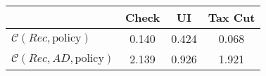 \begin{tabular}{@{}lccc@{}} 
\toprule 
                          & Check      & UI    & Tax Cut    \\  \midrule 
$\mathcal{C}(Rec,\text{policy})$ & 0.140  & 0.424  & 0.068     \\ 
$\mathcal{C}(Rec, AD,\text{policy})$ & 2.139  & 0.926  & 1.921     \\ 
\end{tabular}  
